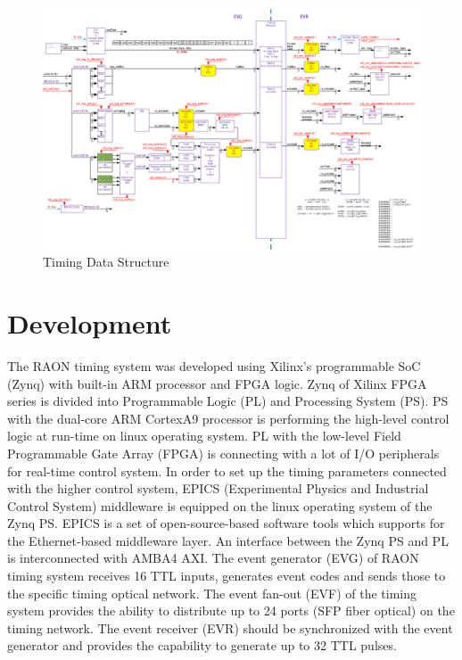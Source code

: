 \documentclass[journal]{IEEEtran}
\begin{document}
\begin{figure}[!htb]
	\centering
	\includegraphics*[width=1\textwidth, height=0.5\textwidth]{img1-1.png}
	\caption{Timing Data Structure}
	\label{timing_data_structure}
\end{figure}

\section{Development}
The RAON timing system was developed using Xilinx’s programmable SoC (Zynq) with built-in ARM processor and FPGA logic. Zynq of Xilinx FPGA series is divided into Programmable Logic (PL) and Processing System (PS). PS with the dual-core ARM CortexA9 processor is performing the high-level control logic at run-time on linux operating system. PL with the low-level Field Programmable Gate Array (FPGA) is connecting with a lot of I/O peripherals for real-time control system. In order to set up the timing parameters connected with the higher control system, EPICS (Experimental Physics and Industrial Control System) middleware is equipped on the linux operating system of the Zynq PS. EPICS is a set of open-source-based software tools which supports for the Ethernet-based middleware layer. An interface between the Zynq PS and PL is interconnected with AMBA4 AXI. The event generator (EVG) of RAON timing system receives 16 TTL inputs, generates event codes and sends those to the specific timing optical network. The event fan-out (EVF) of the timing system provides the ability to distribute up to 24 ports (SFP fiber optical) on the timing network. The event receiver (EVR) should be synchronized with the event generator and provides the capability to generate up to 32 TTL pulses. 
\end{document}
